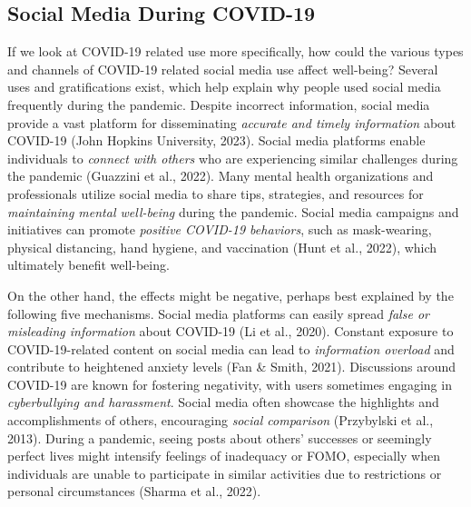 \documentclass[
  man,mask,floatsintext]{apa7}
\begin{document}
\subsection{Social Media During COVID-19}\label{social-media-during-covid-19}

If we look at COVID-19 related use more specifically, how could the various types and channels of COVID-19 related social media use affect well-being?
Several uses and gratifications exist, which help explain why people used social media frequently during the pandemic.
Despite incorrect information, social media provide a vast platform for disseminating \emph{accurate and timely information} about COVID-19 (John Hopkins University, 2023).
Social media platforms enable individuals to \emph{connect with others} who are experiencing similar challenges during the pandemic (Guazzini et al., 2022).
Many mental health organizations and professionals utilize social media to share tips, strategies, and resources for \emph{maintaining mental well-being} during the pandemic.
Social media campaigns and initiatives can promote \emph{positive COVID-19 behaviors}, such as mask-wearing, physical distancing, hand hygiene, and vaccination (Hunt et al., 2022), which ultimately benefit well-being.

On the other hand, the effects might be negative, perhaps best explained by the following five mechanisms.
Social media platforms can easily spread \emph{false or misleading information} about COVID-19 (Li et al., 2020).
Constant exposure to COVID-19-related content on social media can lead to \emph{information overload} and contribute to heightened anxiety levels (Fan \& Smith, 2021).
Discussions around COVID-19 are known for fostering negativity, with users sometimes engaging in \emph{cyberbullying and harassment}.
Social media often showcase the highlights and accomplishments of others, encouraging \emph{social comparison} (Przybylski et al., 2013).
During a pandemic, seeing posts about others' successes or seemingly perfect lives might intensify feelings of inadequacy or FOMO, especially when individuals are unable to participate in similar activities due to restrictions or personal circumstances (Sharma et al., 2022).
\end{document}
